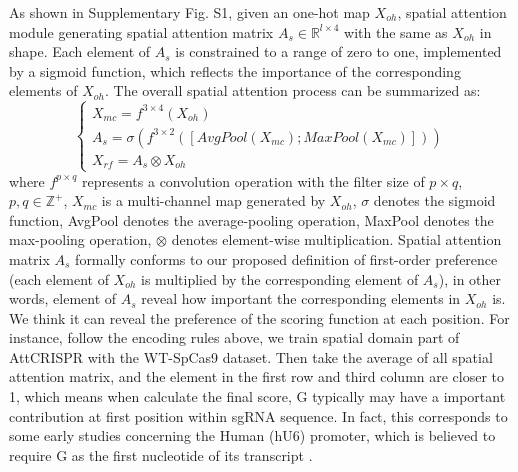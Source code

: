 \documentclass{bioinfo}
\begin{document}
As shown in Supplementary Fig. S1, given an one-hot map $X_{oh}$, spatial attention module generating spatial attention matrix 
$A_s\in\mathbb{R}^{l\times 4}$ with the same as $X_{oh}$ in shape. 
Each element of $A_s$ is constrained to a range of zero to one, implemented by a sigmoid function, which reflects the importance of the corresponding elements of $X_{oh}$.
The overall spatial attention process can be summarized as:
\begin{equation}
\left\{\begin{array}{l}
X_{mc} = f^{3\times4}(X_{oh})
\\A_s = \sigma(f^{3\times2}([AvgPool(X_{mc});MaxPool(X_{mc})]))
\\X_{rf} = A_s\otimes X_{oh}
\end{array}\right.\label{eq:11}
\end{equation}
where $f^{p\times q}$ represents a convolution operation with the filter size of $p\times q$, 
$p,q\in\mathbb{Z}^{+}$, $X_{mc}$ is a multi-channel map generated by $X_{oh}$, $\sigma$ denotes the sigmoid function, 
AvgPool denotes the average-pooling operation, MaxPool denotes the max-pooling operation, $\otimes$ denotes element-wise multiplication.
Spatial attention matrix $A_s$ formally conforms to our proposed definition of first-order preference (each element of $X_{oh}$ is multiplied by the corresponding element of $A_s$), 
in other words, element of $A_s$ reveal how important the corresponding elements in $X_{oh}$ is. 
We think it can reveal the preference of the scoring function at each position. 
For instance, follow the encoding rules above, we train spatial domain part of AttCRISPR with the WT-SpCas9 dataset. 
Then take the average of all spatial attention matrix, and the element in the first row and third column are closer to 1, which means when calculate the final score, 
G typically may have a important contribution at first position within sgRNA sequence. 
In fact, this corresponds to some early studies concerning the Human (hU6) promoter, which is believed to require G as the first nucleotide of its transcript \citep{jinek2012a,cong2013multiplex,mali2013rnaguided}.
\end{document}
